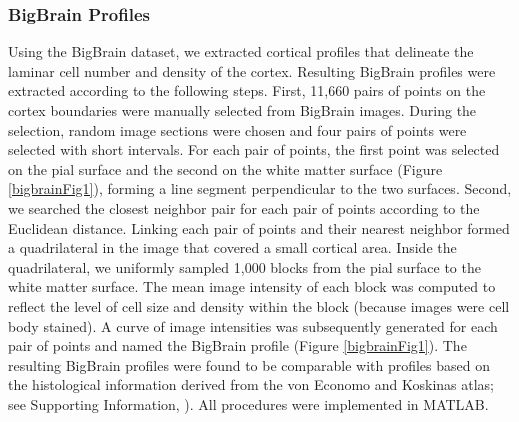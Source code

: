 \begin{refsection}
\subsubsection*{BigBrain Profiles}
Using the BigBrain dataset, we extracted cortical profiles that delineate the laminar cell number and density of the cortex. Resulting BigBrain profiles were extracted according to the following steps. First, 11,660 pairs of points on the cortex boundaries were manually selected from BigBrain images. During the selection, random image sections were chosen and four pairs of points were selected with short intervals. For each pair of points, the first point was selected on the pial surface and the second on the white matter surface (Figure \ref{bigbrainFig1}), forming a line segment perpendicular to the two surfaces. Second, we searched the closest neighbor pair for each pair of points according to the Euclidean distance. Linking each pair of points and their nearest neighbor formed a quadrilateral in the image that covered a small cortical area. Inside the quadrilateral, we uniformly sampled 1,000 blocks from the pial surface to the white matter surface. The mean image intensity of each block was computed to reflect the level of cell size and density within the block (because images were cell body stained). A curve of image intensities was subsequently generated for each pair of points and named the BigBrain profile (Figure \ref{bigbrainFig1}). The resulting BigBrain profiles were found to be comparable with profiles based on the histological information derived from the von Economo and Koskinas atlas; see Supporting Information, \citet{WEI2019bigbrain}). All procedures were implemented in MATLAB.


\end{refsection}
